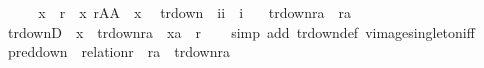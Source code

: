 \begin{isabellebody}
\isanewline
\ \ \isamarkupfalse%
\ \isamarkupfalse%
\ {\isachardoublequoteopen}x\ {\isasymin}\ r\ {\isasymLongrightarrow}\ x{\isasymin}\ r{\isasyminter}A{\isasymtimes}A{\isachardoublequoteclose}\ \ x\ \isacommand{{\isachardot}{\kern0pt}}\isamarkupfalse%
\isanewline
{}\isamarkupfalse%
%
\endisatagproof
{\isafoldproof}%
%
\isadelimproof
\isanewline
%
\endisadelimproof
\isanewline
{}\isamarkupfalse%
\ tr{\isacharunderscore}{\kern0pt}down\ {\isacharcolon}{\kern0pt}{\isacharcolon}{\kern0pt}\ {\isachardoublequoteopen}{\isacharbrackleft}{\kern0pt}i{\isacharcomma}{\kern0pt}i{\isacharbrackright}{\kern0pt}\ {\isasymRightarrow}\ i{\isachardoublequoteclose}\isanewline
\ \ \ {\isachardoublequoteopen}tr{\isacharunderscore}{\kern0pt}down{\isacharparenleft}{\kern0pt}r{\isacharcomma}{\kern0pt}a{\isacharparenright}{\kern0pt}\ {\isacharequal}{\kern0pt}\ {\isacharparenleft}{\kern0pt}r{\isacharcircum}{\kern0pt}{\isacharplus}{\kern0pt}{\isacharparenright}{\kern0pt}{\isacharminus}{\kern0pt}{\isacharbackquote}{\kern0pt}{\isacharbackquote}{\kern0pt}{\isacharbraceleft}{\kern0pt}a{\isacharbraceright}{\kern0pt}{\isachardoublequoteclose}\isanewline
\isanewline
{}\isamarkupfalse%
\ tr{\isacharunderscore}{\kern0pt}downD\ {\isacharcolon}{\kern0pt}\ {\isachardoublequoteopen}x\ {\isasymin}\ tr{\isacharunderscore}{\kern0pt}down{\isacharparenleft}{\kern0pt}r{\isacharcomma}{\kern0pt}a{\isacharparenright}{\kern0pt}\ {\isasymLongrightarrow}\ {\isasymlangle}x{\isacharcomma}{\kern0pt}a{\isasymrangle}\ {\isasymin}\ r{\isacharcircum}{\kern0pt}{\isacharplus}{\kern0pt}{\isachardoublequoteclose}\isanewline
%
\isadelimproof
\ \ %
\endisadelimproof
%
\isatagproof
{}\isamarkupfalse%
\ {\isacharparenleft}{\kern0pt}simp\ add{\isacharcolon}{\kern0pt}\ tr{\isacharunderscore}{\kern0pt}down{\isacharunderscore}{\kern0pt}def\ vimage{\isacharunderscore}{\kern0pt}singleton{\isacharunderscore}{\kern0pt}iff{\isacharparenright}{\kern0pt}%
\endisatagproof
{\isafoldproof}%
%
\isadelimproof
\isanewline
%
\endisadelimproof
\isanewline
{}\isamarkupfalse%
\ pred{\isacharunderscore}{\kern0pt}down\ {\isacharcolon}{\kern0pt}\ {\isachardoublequoteopen}relation{\isacharparenleft}{\kern0pt}r{\isacharparenright}{\kern0pt}\ {\isasymLongrightarrow}\ r{\isacharminus}{\kern0pt}{\isacharbackquote}{\kern0pt}{\isacharbackquote}{\kern0pt}{\isacharbraceleft}{\kern0pt}a{\isacharbraceright}{\kern0pt}\ {\isasymsubseteq}\ tr{\isacharunderscore}{\kern0pt}down{\isacharparenleft}{\kern0pt}r{\isacharcomma}{\kern0pt}a{\isacharparenright}{\kern0pt}{\isachardoublequoteclose}\isanewline

\end{isabellebody}
